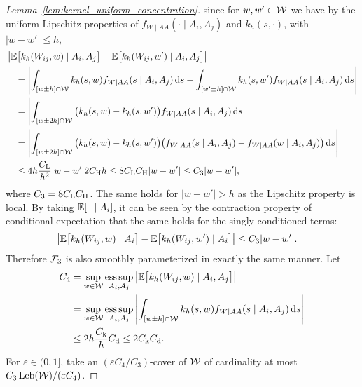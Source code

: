 \begin{proof}[Lemma~\ref{lem:kernel_uniform_concentration}]
  since for $w,w' \in \mathcal{W}$ we have
  by the uniform Lipschitz properties of
  $f_{W \mid AA}(\cdot \mid A_i, A_j)$ and
  $k_h(s, \cdot)$,
  with $|w-w'| \leq h$,
  \begin{align*}
    &\left|
    \mathbb{E}\big[ k_h(W_{i j},w) \mid A_i, A_j \big]
    - \mathbb{E}\big[ k_h(W_{i j},w') \mid A_i, A_j \big]
    \right| \\
    &\quad=
    \left|
    \int_{[w \pm h] \cap \mathcal{W}}
    k_h(s,w)
    f_{W \mid AA}(s \mid A_i, A_j)
    \,\mathrm{d}s
    - \int_{[w' \pm h] \cap \mathcal{W}}
    k_h(s,w')
    f_{W \mid AA}(s \mid A_i, A_j)
    \,\mathrm{d}s
    \right| \\
    &\quad=
    \left|
    \int_{[w \pm 2h] \cap \mathcal{W}}
    \big(
      k_h(s,w)
      - k_h(s,w')
    \big)
    f_{W \mid AA}(s \mid A_i, A_j)
    \,\mathrm{d}s
    \right| \\
    &\quad=
    \left|
    \int_{[w \pm 2h] \cap \mathcal{W}}
    \big(
      k_h(s,w)
      - k_h(s,w')
    \big)
    \big(
      f_{W \mid AA}(s \mid A_i, A_j)
      - f_{W \mid AA}(w \mid A_i, A_j)
    \big)
    \,\mathrm{d}s
    \right| \\
    &\quad\leq
    4h
    \frac{C_{\mathrm{L}}}{h^2}
    |w-w'|
    2 C_{\mathrm{H}} h
    \leq
    8 C_{\mathrm{L}} C_{\mathrm{H}}
    |w-w'|
    \leq
    C_3
    |w-w'|,
  \end{align*}
  where $C_3 = 8 C_{\mathrm{L}} C_{\mathrm{H}}$.
  The same holds for $|w-w'| > h$
  as the Lipschitz property is local.
  By taking $\mathbb{E}[\, \cdot \mid A_i]$,
  it can be seen
  by the contraction property of conditional expectation that
  the same holds for the
  singly-conditioned terms:
  \begin{align*}
    \left|
    \mathbb{E}\big[ k_h(W_{i j},w) \mid A_i \big]
    - \mathbb{E}\big[ k_h(W_{i j},w') \mid A_i \big]
    \right|
    &\leq
    C_3
    |w-w'|.
  \end{align*}
  Therefore $\mathcal{F}_3$ is also smoothly parameterized
  in exactly the same manner.
  Let
  \begin{align*}
    C_4
    &=
    \sup_{w \in \mathcal{W}}
    \operatorname*{ess\,sup}_{A_i, A_j}
    \big|
    \mathbb{E}\big[ k_h(W_{i j},w) \mid A_i, A_j \big]
    \big| \\
    &=
    \sup_{w \in \mathcal{W}}
    \operatorname*{ess\,sup}_{A_i, A_j}
    \left|
    \int_{[w \pm h] \cap \mathcal{W}}
    k_h(s,w)
    f_{W \mid AA}(s \mid A_i, A_j)
    \,\mathrm{d}s
    \right| \\
    &\leq 2h \frac{C_{\mathrm{k}}}{h} C_{\mathrm{d}}
    \leq 2 C_{\mathrm{k}} C_{\mathrm{d}}.
  \end{align*}
  For $\varepsilon \in (0,1]$,
  take an $(\varepsilon C_4/C_3)$-cover of $\mathcal{W}$
  of cardinality at most $C_3 \operatorname{Leb}(\mathcal{W}) / (\varepsilon C_4)$.

\end{proof}

